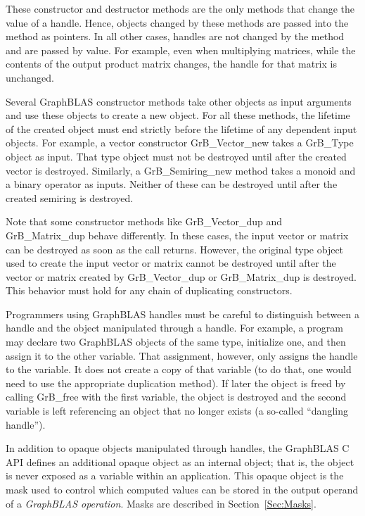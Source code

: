 These constructor and destructor methods are the only methods that change 
the value of a handle.  Hence, objects changed by these methods are passed
into the method as pointers.  In all other cases, handles are not changed by the 
method and are passed by value.  For example, even when multiplying matrices, 
while the contents of the output product matrix changes, the handle for that 
matrix is unchanged. 

Several GraphBLAS constructor methods take other objects as input arguments
and use these objects to create a new object. For all these
methods, the lifetime of the created object must end strictly before
the lifetime of any dependent input objects. For example, a vector constructor
{\sf GrB\_Vector\_new} takes a {\sf GrB\_Type} object as input. That type
object must not be destroyed until after the created vector is destroyed.
Similarly, a {\sf GrB\_Semiring\_new} method takes a monoid and
a binary operator as inputs. Neither of these can be destroyed until
after the created semiring is destroyed.

Note that some constructor methods like {\sf GrB\_Vector\_dup} and 
{\sf GrB\_Matrix\_dup} behave differently. In these cases, the input 
vector or matrix can
be destroyed as soon as the call returns. However, the original type
object used to create the input vector or matrix cannot be destroyed
until after the vector or matrix created by {\sf GrB\_Vector\_dup} or
{\sf GrB\_Matrix\_dup} is destroyed.  This behavior must hold for any
chain of duplicating constructors.

Programmers using GraphBLAS handles must be careful to distinguish between a 
handle and the object manipulated through a handle.  For example, a program may 
declare two GraphBLAS objects of the same type, initialize one, and then assign 
it to the other variable.  That assignment, however, only assigns the handle to 
the variable.  It does not create a copy of that variable (to do that, one 
would need to use the appropriate duplication method).  If later the object is 
freed by calling {\sf GrB\_free} with the first variable, the object is 
destroyed and the second variable is left referencing an object that no longer 
exists (a so-called ``dangling handle'').

In addition to opaque objects manipulated through handles, the GraphBLAS C API 
defines an additional opaque object as an internal object; that is, the object 
is never exposed as a variable within an application.  This opaque object is 
the mask used to control which computed values can be stored in the output 
operand of a \emph{GraphBLAS operation}.  Masks are described in 
Section~\ref{Sec:Masks}.

